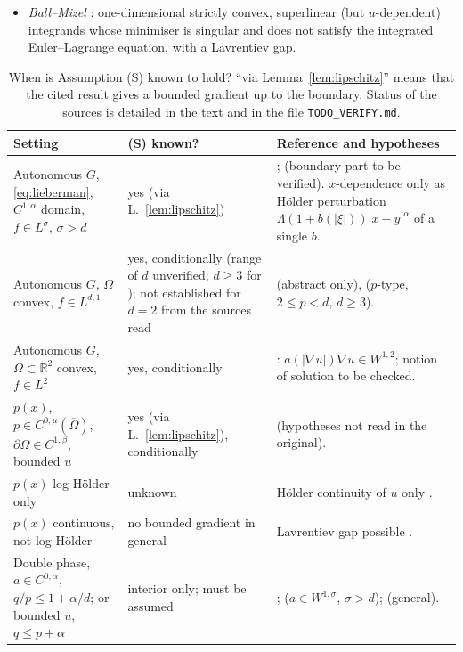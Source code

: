 \documentclass[11pt]{amsart}
\theoremstyle{definition}
\theoremstyle{remark}
\numberwithin{equation}{section}
\newcommand{\R}{\mathbb{R}}
\newcommand{\abs}[1]{\lvert #1\rvert}
\begin{document}
\begin{itemize}[leftmargin=1.5em]
\item \emph{Ball--Mizel} \cite{BallMizel1985}: one-dimensional strictly convex, superlinear (but $u$-dependent) integrands whose minimiser is singular and does not satisfy the integrated Euler--Lagrange equation, with a Lavrentiev gap.
\end{itemize}

\begin{table}[t]
\caption{When is Assumption (S) known to hold? ``via Lemma~\ref{lem:lipschitz}'' means that the cited result gives a bounded gradient up to the boundary. Status of the sources is detailed in the text and in the file \texttt{TODO\_VERIFY.md}.}\label{tab:S}
\small
\begin{tabular}{@{}>{\raggedright\arraybackslash}p{4.6cm}>{\raggedright\arraybackslash}p{2.2cm}>{\raggedright\arraybackslash}p{7.4cm}@{}}
\toprule
Setting & (S) known? & Reference and hypotheses\\
\midrule
Autonomous $G$, \eqref{eq:lieberman}, $C^{1,\alpha}$ domain, $f\in L^\sigma$, $\sigma>d$ & yes (via L.~\ref{lem:lipschitz}) & \cite[Cor.~1.4]{Antonini2026}; \cite[Thm.~1.7]{Lieberman1991} (boundary part to be verified). $x$-dependence only as H\"older perturbation $\Lambda(1+b(\abs\xi))\abs{x-y}^\alpha$ of a single $b$.\\
Autonomous $G$, $\Omega$ convex, $f\in L^{d,1}$ & yes, conditionally (range of $d$ unverified; $d\ge3$ for \cite{CianchiMazya2014JEMS}); not established for $d=2$ from the sources read & \cite{CianchiMazya2011} (abstract only), \cite[Thm.~3.5]{CianchiMazya2014JEMS} ($p$-type, $2\le p<d$, $d\ge3$).\\
Autonomous $G$, $\Omega\subset\R^2$ convex, $f\in L^2$ & yes, conditionally & \cite[Thm.~2.3]{CianchiMazya2018}: $a(\abs{\nabla u})\nabla u\in W^{1,2}$; notion of solution to be checked.\\
$p(x)$, $p\in C^{0,\mu}(\overline\Omega)$, $\partial\Omega\in C^{1,\beta}$, bounded $u$ & yes (via L.~\ref{lem:lipschitz}), conditionally & \cite{Fan2007} (hypotheses not read in the original).\\
$p(x)$ log-H\"older only & unknown & H\"older continuity of $u$ only \cite{AcerbiMingione2001}.\\
$p(x)$ continuous, not log-H\"older & no bounded gradient in general & Lavrentiev gap possible \cite[Thm.~30]{BDS2020}.\\
Double phase, $a\in C^{0,\alpha}$, $q/p\le1+\alpha/d$; or bounded $u$, $q\le p+\alpha$ & interior only; must be assumed & \cite{ColomboMingione2015a,ColomboMingione2015b,BaroniColomboMingione2018}; \cite{DeFilippisMingione2021} ($a\in W^{1,\sigma}$, $\sigma>d$); \cite{HastoOk2022} (general).\\

\end{tabular}
\end{table}
\end{document}
